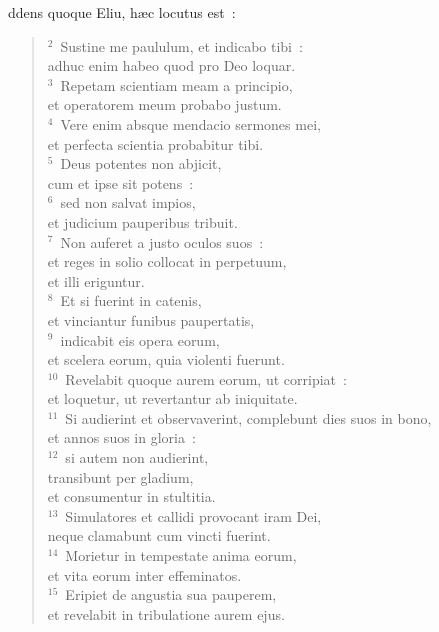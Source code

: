 \bchapter
{}ddens quoque Eliu, h\ae c locutus est~:
\begin{flushleft}\begin{verse}\vspace{6pt}${}^{2}$~Sustine me paululum, et indicabo tibi~:\\ adhuc enim habeo quod pro Deo loquar.\\
${}^{3}$~Repetam scientiam meam a principio,\\ et operatorem meum probabo justum.\\
${}^{4}$~Vere enim absque mendacio sermones mei,\\ et perfecta scientia probabitur tibi.\\
${}^{5}$~Deus potentes non abjicit,\\ cum et ipse sit potens~:\\
${}^{6}$~sed non salvat impios,\\ et judicium pauperibus tribuit.\\
${}^{7}$~Non auferet a justo oculos suos~:\\ et reges in solio collocat in perpetuum,\\ et illi eriguntur.\\
${}^{8}$~Et si fuerint in catenis,\\ et vinciantur funibus paupertatis,\\
${}^{9}$~indicabit eis opera eorum,\\ et scelera eorum, quia violenti fuerunt.\\
${}^{10}$~Revelabit quoque aurem eorum, ut corripiat~:\\ et loquetur, ut revertantur ab iniquitate.\\
${}^{11}$~Si audierint et observaverint, complebunt dies suos in bono,\\ et annos suos in gloria~:\\
${}^{12}$~si autem non audierint,\\ transibunt per gladium,\\ et consumentur in stultitia.\\
${}^{13}$~Simulatores et callidi provocant iram Dei,\\ neque clamabunt cum vincti fuerint.\\
${}^{14}$~Morietur in tempestate anima eorum,\\ et vita eorum inter effeminatos.\\
${}^{15}$~Eripiet de angustia sua pauperem,\\ et revelabit in tribulatione aurem ejus.\\

\end{verse}
\end{flushleft}
